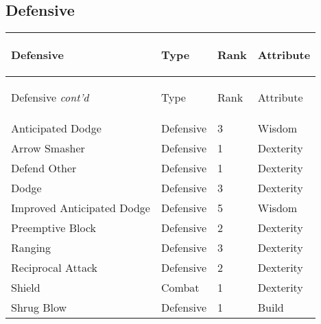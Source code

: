 \documentclass[twoside]{book}
\begin{document}
    

\subsection{Defensive}
    
\begin{longtable}{p{1.25in}lll} 
  Defensive
  &
  \begin{turn}{70}{Type}\end{turn}
          
  &
  \begin{turn}{70}{Rank}\end{turn}
          
  &
  \begin{turn}{70}{Attribute}\end{turn}
          
  \\
  \hline
  \hline
  \endfirsthead
  Defensive \textit{cont'd}
        
  &
  \begin{turn}{70}{Type}\end{turn}
          
  &
  \begin{turn}{70}{Rank}\end{turn}
          
  &
  \begin{turn}{70}{Attribute}\end{turn}
          
  \\
  \hline
  \endhead
      
  \raggedright
           Anticipated Dodge 
  &
   Defensive 
  &
   3 
  &
   Wisdom 
  \tabularnewline
      
  \raggedright
           Arrow Smasher 
  &
   Defensive 
  &
   1 
  &
   Dexterity 
  \tabularnewline
      
  \raggedright
           Defend Other 
  &
   Defensive 
  &
   1 
  &
   Dexterity 
  \tabularnewline
      
  \raggedright
           Dodge 
  &
   Defensive 
  &
   3 
  &
   Dexterity 
  \tabularnewline
      
  \raggedright
           Improved Anticipated Dodge
           
  &
   Defensive 
  &
   5 
  &
   Wisdom 
  \tabularnewline
      
  \raggedright
           Preemptive Block 
  &
   Defensive 
  &
   2 
  &
   Dexterity 
  \tabularnewline
      
  \raggedright
           Ranging 
  &
   Defensive 
  &
   3 
  &
   Dexterity 
  \tabularnewline
      
  \raggedright
           Reciprocal Attack 
  &
   Defensive 
  &
   2 
  &
   Dexterity 
  \tabularnewline
      
  \raggedright
           Shield 
  &
   Combat 
  &
   1 
  &
   Dexterity 
  \tabularnewline
      
  \raggedright
           Shrug Blow 
  &
   Defensive 
  &
   1 
  &
   Build 
  \tabularnewline
      
\end{longtable}
    
\end{document}

